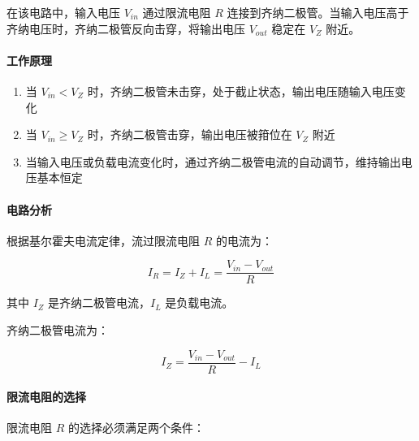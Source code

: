 
在该电路中，输入电压 $V_{in}$ 通过限流电阻 $R$ 连接到齐纳二极管。当输入电压高于齐纳电压时，齐纳二极管反向击穿，将输出电压 $V_{out}$ 稳定在 $V_Z$ 附近。

\paragraph{工作原理}

\begin{enumerate}
  \item 当 $V_{in} < V_Z$ 时，齐纳二极管未击穿，处于截止状态，输出电压随输入电压变化
  \item 当 $V_{in} \geq V_Z$ 时，齐纳二极管击穿，输出电压被箝位在 $V_Z$ 附近
  \item 当输入电压或负载电流变化时，通过齐纳二极管电流的自动调节，维持输出电压基本恒定
\end{enumerate}

\paragraph{电路分析}

根据基尔霍夫电流定律，流过限流电阻 $R$ 的电流为：

\begin{equation}
I_R = I_Z + I_L = \frac{V_{in} - V_{out}}{R} \label{eq:zener-current-balance}
\end{equation}

其中 $I_Z$ 是齐纳二极管电流，$I_L$ 是负载电流。

齐纳二极管电流为：

\begin{equation}
I_Z = \frac{V_{in} - V_{out}}{R} - I_L \label{eq:zener-diode-current}
\end{equation}

\paragraph{限流电阻的选择}

限流电阻 $R$ 的选择必须满足两个条件：

